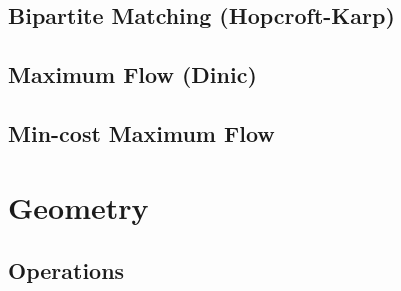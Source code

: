 \documentclass[10pt,landscape,a4paper,twocolumn]{article}
\begin{document}
\subsection{Bipartite Matching (Hopcroft-Karp)}


\subsection{Maximum Flow (Dinic)}


\subsection{Min-cost Maximum Flow}



\section{Geometry}

\subsection{Operations}



%

%

\begin{comment}
ê²©ìì ìŒë¡ êµ¬ì±ë simple polygonìŽ ì£ŒìŽì§. $i$ë polygon ëŽë¶ì ê²©ìì  ì, $b$ë polygon ì ë¶ ì ê²©ìì  ì, $A$ë polygonì ëìŽëŒê³  í  ë, ë€ìê³Œ ê°ì ììŽ ì±ëŠœíë€.

$A = i + \frac{b}{2} - 1$
\end{comment}
\end{document}
